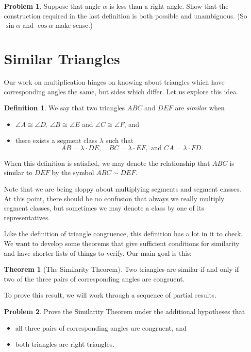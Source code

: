 \documentclass{amsart}
\theoremstyle{definition}
\newtheorem{problem}{Problem}[section]
\newtheorem*{definition}{Definition}
\newtheorem*{theorem}{Theorem}
\begin{document}
\begin{problem}\label{prob:defn-trig}
Suppose that angle $\alpha$ is less than a right angle. Show that the construction required in the last definition is both possible and unambiguous. (So $\sin\alpha$ and $\cos\alpha$ make sense.)
\end{problem}


\vfill
\pagebreak

\section{Similar Triangles}

Our work on multiplication hinges on knowing about triangles which have corresponding angles the same, but sides which differ. Let us explore this idea.

\begin{definition} We say that two triangles $ABC$ and $DEF$ are \emph{similar} when 
\begin{itemize}
\item $\angle A \cong \angle D$, $\angle B \cong \angle E$ and $\angle C \cong \angle F$, and 
\item there exists a segment class $\lambda$ such that 
\[
AB = \lambda \cdot DE, \quad BC = \lambda \cdot EF, \mbox{ and } CA = \lambda\cdot FD.
\]
\end{itemize}
When this definition is satisfied, we may denote the relationship that $ABC$ is similar to $DEF$ by the symbol $ABC \sim DEF$.
\end{definition}

Note that we are being sloppy about multiplying segments and segment classes. At this point, there should be no confusion that always we really multiply segment classes, but sometimes we may denote a class by one of its representatives.

Like the definition of triangle congruence, this definition has a lot in it to check. We want to develop some theorems that give sufficient conditions for similarity and have shorter lists of things to verify. Our main goal is this:

\begin{theorem}[The Similarity Theorem] Two triangles are similar if and only if two of the three pairs of corresponding angles are congruent.
\end{theorem}

To prove this result, we will work through a sequence of partial results.

\begin{problem} Prove the Similarity Theorem under the additional hypotheses that 
\begin{itemize}
\item all three pairs of corresponding angles are congruent, and
\item both triangles are right triangles.
\end{itemize}
\end{problem}
\end{document}
